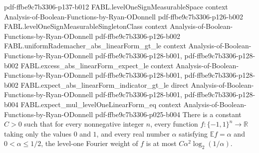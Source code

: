 \begin{theorem}
  {pdf-ffbe9c7b3306-p137-b012}
\proofstep
  {FABL.levelOneSignMeasurableSpace}
  {context}
  {Analysis-of-Boolean-Functions-by-Ryan-ODonnell}
  {pdf-ffbe9c7b3306-p126-b002}
\proofstep
  {FABL.levelOneSignMeasurableSingletonClass}
  {context}
  {Analysis-of-Boolean-Functions-by-Ryan-ODonnell}
  {pdf-ffbe9c7b3306-p126-b002}
\proofstep
  {FABL.uniformRademacher_abs_linearForm_gt_le}
  {context}
  {Analysis-of-Boolean-Functions-by-Ryan-ODonnell}
  {pdf-ffbe9c7b3306-p128-b001,
    pdf-ffbe9c7b3306-p128-b002}
\proofstep
  {FABL.excess_abs_linearForm_expect_le}
  {context}
  {Analysis-of-Boolean-Functions-by-Ryan-ODonnell}
  {pdf-ffbe9c7b3306-p128-b001,
    pdf-ffbe9c7b3306-p128-b002}
\proofstep
  {FABL.expect_abs_linearForm_indicator_gt_le}
  {direct}
  {Analysis-of-Boolean-Functions-by-Ryan-ODonnell}
  {pdf-ffbe9c7b3306-p128-b001,
    pdf-ffbe9c7b3306-p128-b004}
\proofstep
  {FABL.expect_mul_levelOneLinearForm_eq}
  {context}
  {Analysis-of-Boolean-Functions-by-Ryan-ODonnell}
  {pdf-ffbe9c7b3306-p025-b004}
There is a constant $C>0$ such that for every nonnegative integer $n$, every function
$f:\{-1,1\}^n\to\mathbb{R}$ taking only the values $0$ and $1$, and every real number
$\alpha$ satisfying $\mathbb{E}f=\alpha$ and $0<\alpha\le 1/2$, the level-one Fourier
weight of $f$ is at most $C\alpha^2\log_2(1/\alpha)$.
\end{theorem}
